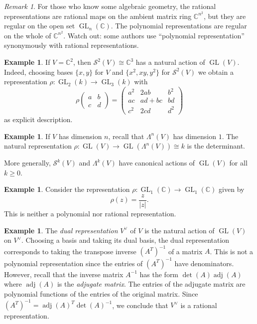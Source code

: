 \documentclass[12pt]{article}
\theoremstyle{plain}
\theoremstyle{definition}
\newtheorem{example}[theorem]{Example}
\theoremstyle{remark}
\newtheorem{remark}[theorem]{Remark}
\numberwithin{equation}{section}
\begin{document}
\begin{remark}
For those who know some algebraic geometry,
the rational representations are rational maps on the ambient matrix
ring $\mathbb{C}^{n^2}$, but they are regular on the open set
$\operatorname{GL}_n(\mathbb{C})$.
The polynomial representations are regular on the whole of
$\mathbb{C}^{n^2}$.
Watch out: some authors use ``polynomial representation'' synonymously with
rational representations.
\end{remark}

\begin{example}
If $V = \mathbb{C}^2$, then $\mathcal{S}^2(V) \cong \mathbb{C}^3$
has a natural action of $\operatorname{GL}(V)$.
Indeed, choosing bases $\{x,y\}$ for $V$ and $\{x^2,xy,y^2\}$
for $\mathcal{S}^2(V)$ we obtain a representation
$\rho : \operatorname{GL}_2(k) \to \operatorname{GL}_3(k)$
with
\[
\rho
\begin{pmatrix} a & b \\ c & d \end{pmatrix}
=
\begin{pmatrix}
a^2 & 2ab & b^2\\
ac & ad+bc & bd\\
c^2 & 2cd & d^2
\end{pmatrix} 
\]
as explicit description.
\end{example}

\begin{example}
If $V$ has dimension $n$, recall that $\Lambda^n(V)$ has dimension $1$.
The natural representation
$\rho: \operatorname{GL}(V) \to \operatorname{GL}(\Lambda^n(V)) \cong k$
is the determinant.
\end{example}

More generally, $\mathcal{S}^k(V)$ and $\Lambda^k(V)$
have canonical actions of $\operatorname{GL}(V)$ for all $k \ge 0$.

\begin{example}
Consider the representation
$\rho : \operatorname{GL}_1(\mathbb{C}) \to
\operatorname{GL}_1(\mathbb{C})$
given by
\[
\rho(z) = \frac{z}{|z|} .
\]
This is neither a polynomial nor rational representation.
\end{example}

\begin{example}
The \emph{dual representation} $V^\vee$ of $V$ is the natural
action of $\operatorname{GL}(V)$ on $V^\vee$.
Choosing a basis and taking its dual basis,
the dual representation corresponds to taking the transpose inverse
$(A^T)^{-1}$
of a matrix $A$.
This is not a polynomial representation since the entries of $(A^T)^{-1}$ have
denominators.
However, recall that the inverse matrix $A^{-1}$ has the form
$\det(A)\operatorname{adj}(A)$ where
$\operatorname{adj}(A)$ is the \emph{adjugate matrix}.
The entries of the adjugate matrix are polynomial functions of the
entries of the original matrix.
Since $(A^T)^{-1}=\operatorname{adj}(A)^T \det(A)^{-1}$,
we conclude that $V^\vee$ is a rational representation.
\end{example}
\end{document}

